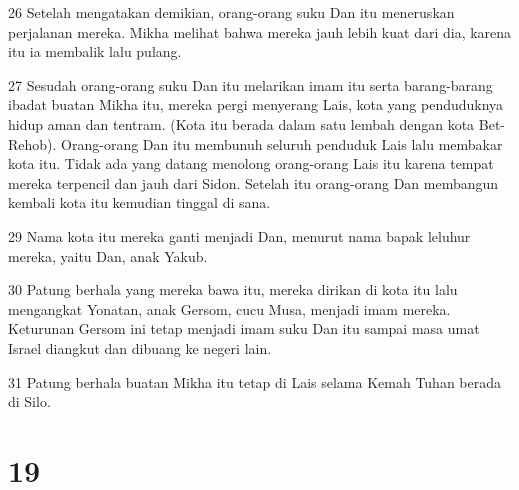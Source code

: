 \par 26 Setelah mengatakan demikian, orang-orang suku Dan itu meneruskan perjalanan mereka. Mikha melihat bahwa mereka jauh lebih kuat dari dia, karena itu ia membalik lalu pulang.
\par 27 Sesudah orang-orang suku Dan itu melarikan imam itu serta barang-barang ibadat buatan Mikha itu, mereka pergi menyerang Lais, kota yang penduduknya hidup aman dan tentram. (Kota itu berada dalam satu lembah dengan kota Bet-Rehob). Orang-orang Dan itu membunuh seluruh penduduk Lais lalu membakar kota itu. Tidak ada yang datang menolong orang-orang Lais itu karena tempat mereka terpencil dan jauh dari Sidon. Setelah itu orang-orang Dan membangun kembali kota itu kemudian tinggal di sana.
\par 29 Nama kota itu mereka ganti menjadi Dan, menurut nama bapak leluhur mereka, yaitu Dan, anak Yakub.
\par 30 Patung berhala yang mereka bawa itu, mereka dirikan di kota itu lalu mengangkat Yonatan, anak Gersom, cucu Musa, menjadi imam mereka. Keturunan Gersom ini tetap menjadi imam suku Dan itu sampai masa umat Israel diangkut dan dibuang ke negeri lain.
\par 31 Patung berhala buatan Mikha itu tetap di Lais selama Kemah Tuhan berada di Silo.

\chapter{19}

